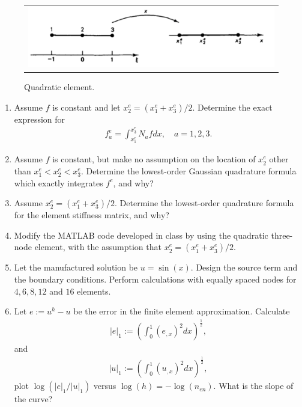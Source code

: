 \documentclass[12pt]{article}
\begin{document}
\begin{enumerate}
\begin{figure}[h]
	\begin{center}
	\begin{tabular}{c}
\includegraphics[angle=0, trim=0 0 0 0, clip=true, scale = 0.35]{./quad-elem.pdf}
\end{tabular}
\end{center} 
\caption{Quadratic element.}
\label{fig:quad_elem}
\end{figure}
\begin{enumerate}

\item Assume $f$ is constant and let $x_2^e = (x_1^e + x_3^e)/2$. Determine the exact expression for 
\begin{align*}
f_a^e=\int_{x_1^e}^{x_3^e} N_a f dx, \quad a = 1, 2, 3.
\end{align*}

\item Assume $f$ is constant, but make no assumption on the location of $x_2^e$ other than $x_1^e < x_2^e < x_3^e$. Determine the lowest-order Gaussian quadrature formula which exactly integrates $f^e$, and why?

\item Assume $x_2^e = (x_1^e + x_3^e)/2$. Determine the lowest-order quadrature formula for the element stiffness matrix, and why?

\item Modify the MATLAB code developed in class by using the quadratic three-node element, with the assumption that $x_2^e = (x_1^e + x_3^e)/2$.

\item Let the manufactured solution be $u = \sin(x)$. Design the source term and the boundary conditions. Perform calculations with equally spaced nodes for $4, 6, 8, 12$ and $16$ elements. 

\item Let $e := u^h - u$ be the error in the finite element approximation. Calculate
\begin{align*}
|e|_1 := \left( \int_0^1 \left( e_{,x} \right)^2 dx \right)^{\frac12},
\end{align*}
and 
\begin{align*}
|u|_1 := \left( \int_0^1 \left( u_{,x} \right)^2 dx \right)^{\frac12},
\end{align*}
plot $\log\left( |e|_1 /  |u|_1 \right)$ versus $\log(h) = - \log(n_{en})$. What is the slope of the curve?
\end{enumerate}
\end{enumerate}
\end{document}
